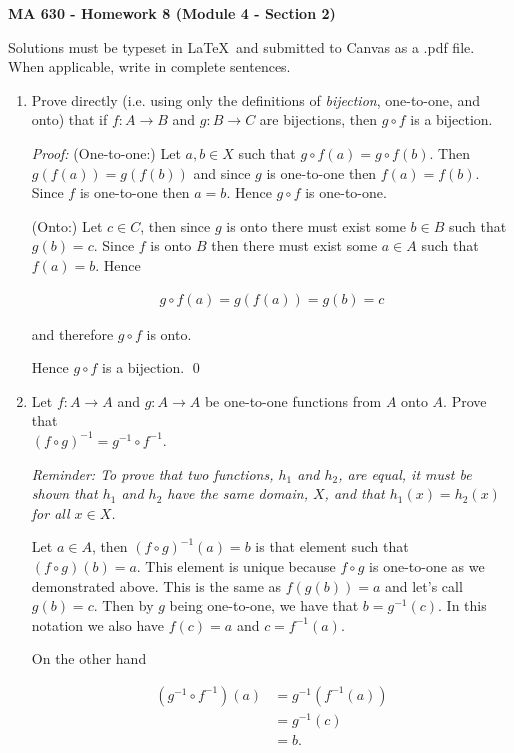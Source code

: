\documentclass[12pt]{article}
\begin{document}
\pagestyle{empty}

 {\noindent \textbf{\large MA 630 - Homework 8 (Module 4 - Section 2)}
\vspace{.25in}

\noindent Solutions must be typeset in \LaTeX \ and submitted to Canvas as a .pdf file. When applicable, write in complete sentences.
\vspace{.25in}

\begin{enumerate}
\item Prove directly (i.e. using only the definitions of \emph{bijection}, {one-to-one}, and {onto}) that if $f:A \to B$ and $g: B \to C$ are bijections, then $g \circ f$ is a bijection.

{\it Proof:} (One-to-one:)  Let $a,b\in X$ such that $g\circ f(a) = g\circ f(b)$.  Then $g(f(a))=g(f(b))$ and since $g$ is one-to-one then $f(a)=f(b)$.  Since $f$ is one-to-one then $a=b$.  Hence $g\circ f$ is one-to-one.

(Onto:) Let $c\in C$, then since $g$ is onto there must exist some $b\in B$ such that $g(b)=c$.  Since $f$ is onto $B$ then there must exist some $a\in A$ such that $f(a)=b$.  Hence

\begin{align*}
  g\circ f(a) = g(f(a))=g(b)=c
\end{align*}

and therefore $g\circ f$ is onto.

Hence $g\circ f$ is a bijection.  \qed

\item Let $f:A \to A$ and $g:A \to A$ be one-to-one functions from $A$ onto $A$. Prove that \\ $(f \circ g)^{-1} = g^{-1} \circ f^{-1}$.

\emph{Reminder: To prove that two functions, $h_1$ and $h_2$, are equal, it must be shown that $h_1$ and $h_2$ have the same domain, $X$, and that $h_1(x) = h_2(x)$ for all $x \in X$.}

Let $a\in A$, then $(f\circ g)^{-1}(a)=b$ is that element such that $(f\circ g)(b)=a$.  This element is unique because $f\circ g$ is one-to-one as we demonstrated above.  This is the same as $f(g(b))=a$ and let's call $g(b)=c$.  Then by $g$ being one-to-one, we have that $b=g^{-1}(c)$.  In this notation we also have $f(c)=a$ and $c=f^{-1}(a)$.

On the other hand

\begin{align*}
    (g^{-1}\circ f^{-1})(a)&=g^{-1}(f^{-1}(a)) \\
    &=g^{-1}(c) \\
    &= b.
\end{align*}


\end{enumerate}}
\end{document}
